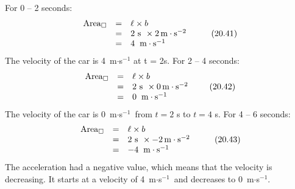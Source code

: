 {\begin{mdframed}[linewidth=4, leftmargin=40, rightmargin=40]
\begin{exercise}
\begin{enumerate}[noitemsep, label=\textbf{Step} \textbf{\arabic*}. ]
      \label{m38795*id74953}For 0 -- 2 seconds:
\label{m38795*id74963}\nopagebreak\noindent{}
    \begin{equation}
    \begin{array}{ccc}\hfill {\mathrm{Area}}_{\square }& =& \ell \ensuremath{\times}b\hfill \\ & =& 2\phantom{\rule{3.33333pt}{0ex}}\mathrm{s}\phantom{\rule{4pt}{0ex}}\ensuremath{\times}2\phantom{\rule{0.166667em}{0ex}}\mathrm{m}\ensuremath{\cdot}{\mathrm{s}}^{-2}\phantom{\rule{4pt}{0ex}}\hfill \\ & =& 4\phantom{\rule{4pt}{0ex}}\phantom{\rule{0.166667em}{0ex}}\mathrm{m}\ensuremath{\cdot}{\mathrm{s}}^{-1}\hfill \end{array}\tag{20.41}
      \end{equation}
The velocity of the car is 4~m$\ensuremath{\cdot}$s${}^{-1}$ at t = 2s.
For 2 -- 4 seconds:
\label{m38795*id75142}\nopagebreak\noindent{}
    \begin{equation}
    \begin{array}{ccc}\hfill {\mathrm{Area}}_{\square }& =& \ell \ensuremath{\times}b\hfill \\ & =& 2\phantom{\rule{3.33333pt}{0ex}}\mathrm{s}\phantom{\rule{4pt}{0ex}}\ensuremath{\times}0\phantom{\rule{0.166667em}{0ex}}\mathrm{m}\ensuremath{\cdot}{\mathrm{s}}^{-2}\hfill \\ & =& 0\phantom{\rule{4pt}{0ex}}\phantom{\rule{0.166667em}{0ex}}\mathrm{m}\ensuremath{\cdot}{\mathrm{s}}^{-1}\hfill \end{array}\tag{20.42}
      \end{equation}
The velocity of the car is 0~m$\ensuremath{\cdot}$s${}^{-1}$~from $t=2$ s to $t=4$ s.
For 4 -- 6 seconds:
\label{m38795*id75347}\nopagebreak\noindent{}
    \begin{equation}
    \begin{array}{ccc}\hfill {\mathrm{Area}}_{\square }& =& \ell \ensuremath{\times}b\hfill \\ & =& 2\phantom{\rule{3.33333pt}{0ex}}\mathrm{s}\phantom{\rule{4pt}{0ex}}\ensuremath{\times}-2\phantom{\rule{0.166667em}{0ex}}\mathrm{m}\ensuremath{\cdot}{\mathrm{s}}^{-2}\phantom{\rule{4pt}{0ex}}\hfill \\ & =& -4\phantom{\rule{4pt}{0ex}}\phantom{\rule{0.166667em}{0ex}}\mathrm{m}\ensuremath{\cdot}{\mathrm{s}}^{-1}\hfill \end{array}\tag{20.43}
      \end{equation}
The acceleration had a negative value, which means that the velocity is decreasing. It starts at a velocity of 4~m$\ensuremath{\cdot}$s${}^{-1}$~and decreases to 0~m$\ensuremath{\cdot}$s${}^{-1}$.

\end{enumerate}
\end{exercise}
\end{mdframed}}
